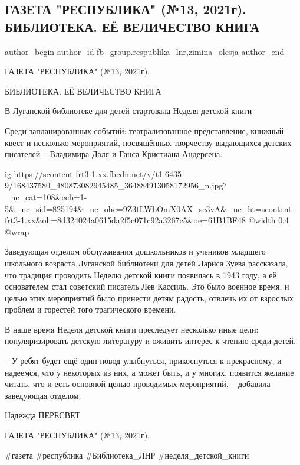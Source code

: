  
 
 
 
 
 
\subsection{ГАЗЕТА "РЕСПУБЛИКА" (№13, 2021г). БИБЛИОТЕКА. ЕЁ ВЕЛИЧЕСТВО КНИГА}
\label{sec:02_04_2021.fb.fb_group.respublika_lnr.1.biblioteka_velichestvo_kniga}
 
\ifcmt
 author_begin
   author_id fb_group.respublika_lnr,zimina_olesja
 author_end
\fi

ГАЗЕТА "РЕСПУБЛИКА" (№13, 2021г). 

БИБЛИОТЕКА. ЕЁ ВЕЛИЧЕСТВО КНИГА

В Луганской библиотеке для детей стартовала Неделя детской книги 

Среди запланированных событий: театрализованное представление, книжный квест и
несколько мероприятий, посвящённых творчеству выдающихся детских писателей –
Владимира Даля и Ганса Кристиана Андерсена.

\ifcmt
  ig https://scontent-frt3-1.xx.fbcdn.net/v/t1.6435-9/168437580_480873082945485_364884913058172956_n.jpg?_nc_cat=108&ccb=1-5&_nc_sid=825194&_nc_ohc=9Z3tLWbOmX0AX_sc3vA&_nc_ht=scontent-frt3-1.xx&oh=8d324024a0615da2f5c071c92a3267c5&oe=61B1BF48
  @width 0.4
  @wrap 
\fi

Заведующая отделом обслуживания дошкольников и учеников младшего школьного
возраста Луганской библиотеки для детей Лариса Зуева рассказала, что традиция
проводить Неделю детской книги появилась в 1943 году, а её основателем стал
советский писатель Лев Кассиль. Это было военное время, и целью этих
мероприятий было принести детям радость, отвлечь их от взрослых проблем и
горестей того трагического времени.  

В наше время Неделя детской книги преследует несколько иные цели:
популяризировать детскую литературу и оживить интерес к чтению среди детей.

– У ребят будет ещё один повод улыбнуться, прикоснуться к прекрасному, и
надеемся, что у некоторых из них, а может быть, и у многих, появится желание
читать, что и есть основной целью проводимых мероприятий, – добавила заведующая
отделом.

Надежда ПЕРЕСВЕТ

ГАЗЕТА "РЕСПУБЛИКА" (№13, 2021г). 

\#газета \#республика \#Библиотека\_ЛНР \#неделя\_детской\_книги

